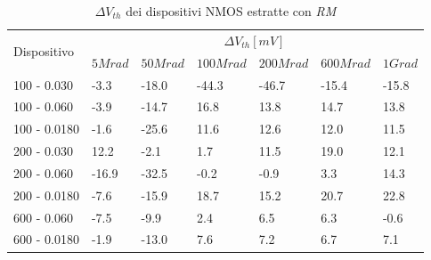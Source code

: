 \documentclass[
	a4paper,
	cleardoublepage=empty,
	headings=twolinechapter,
	numbers=autoenddot,
]{scrbook}
\begin{document}
\begin{table}[H]
  \renewcommand{\arraystretch}{1.3}
  \begin{tabular}{m{2.1cm}  m{1.1cm} m{1.3cm} m{1.5cm} m{1.5cm} m{1.5cm} m{1cm}}
    \toprule
    \multirow{2}{*}{Dispositivo} & \multicolumn{6}{c}{$\Delta V_{th} [mV] $}                                                          \\
    \cmidrule{2-7}
                                 & $5Mrad$                                   & $50Mrad$ & $100Mrad$ & $200Mrad$ & $600Mrad$ & $1Grad$ \\
    \midrule
    100 - 0.030                     & -3.3                                      & -18.0    & -44.3     & -46.7     & -15.4     & -15.8        \\
    \hline
    100 - 0.060                     & -3.9                                      & -14.7    & 16.8      & 13.8      & 14.7      & 13.8        \\
    \hline
    100 - 0.0180                    & -1.6                                      & -25.6    & 11.6      & 12.6      & 12.0      & 11.5        \\
    \hline
    200 - 0.030                     & 12.2                                      & -2.1     & 1.7       & 11.5      & 19.0      & 12.1        \\
    \hline
    200 - 0.060                     & -16.9                                     & -32.5    & -0.2      & -0.9      & 3.3       & 14.3        \\
    \hline
    200 - 0.0180                    & -7.6                                      & -15.9    & 18.7      & 15.2      & 20.7      & 22.8        \\
    \hline
    600 - 0.060                     & -7.5                                      & -9.9     & 2.4       & 6.5       & 6.3       & -0.6        \\
    \hline
    600 - 0.0180                    & -1.9                                      & -13.0    & 7.6       & 7.2       & 6.7       & 7.1        \\
    \bottomrule
  \end{tabular}
  \caption{$\Delta V_{th}$ dei dispositivi NMOS estratte con \emph{RM}}
  \label{tab:deltaVthRMN}
\end{table}
\end{document}

